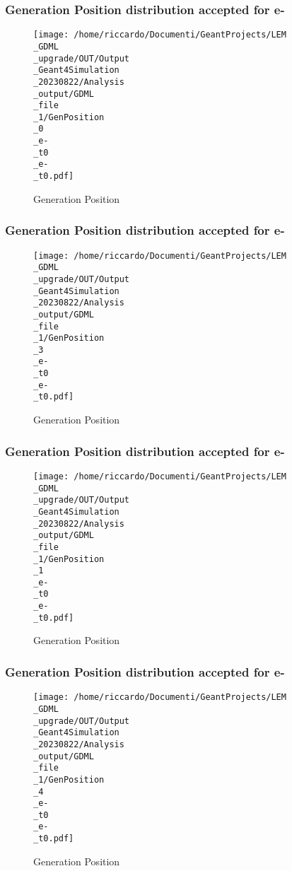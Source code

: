 \documentclass[8pt]{beamer}
\begin{document}
            \begin{frame}
                \frametitle{Generation Position distribution accepted for e-}
            
        \begin{figure}[h]
            \centering
            \texttt{[image: /home/riccardo/Documenti/GeantProjects/LEM\\\_GDML\\\_upgrade/OUT/Output\\\_Geant4Simulation\\\_20230822/Analysis\\\_output/GDML\\\_file\\\_1/GenPosition\\\_0\\\_e-\\\_t0\\\_e-\\\_t0.pdf]}
            \caption{Generation Position}
        \end{figure}
        
            \end{frame}
            
            \begin{frame}
                \frametitle{Generation Position distribution accepted for e-}
            
        \begin{figure}[h]
            \centering
            \texttt{[image: /home/riccardo/Documenti/GeantProjects/LEM\\\_GDML\\\_upgrade/OUT/Output\\\_Geant4Simulation\\\_20230822/Analysis\\\_output/GDML\\\_file\\\_1/GenPosition\\\_3\\\_e-\\\_t0\\\_e-\\\_t0.pdf]}
            \caption{Generation Position}
        \end{figure}
        
            \end{frame}
            
            \begin{frame}
                \frametitle{Generation Position distribution accepted for e-}
            
        \begin{figure}[h]
            \centering
            \texttt{[image: /home/riccardo/Documenti/GeantProjects/LEM\\\_GDML\\\_upgrade/OUT/Output\\\_Geant4Simulation\\\_20230822/Analysis\\\_output/GDML\\\_file\\\_1/GenPosition\\\_1\\\_e-\\\_t0\\\_e-\\\_t0.pdf]}
            \caption{Generation Position}
        \end{figure}
        
            \end{frame}
            
            \begin{frame}
                \frametitle{Generation Position distribution accepted for e-}
            
        \begin{figure}[h]
            \centering
            \texttt{[image: /home/riccardo/Documenti/GeantProjects/LEM\\\_GDML\\\_upgrade/OUT/Output\\\_Geant4Simulation\\\_20230822/Analysis\\\_output/GDML\\\_file\\\_1/GenPosition\\\_4\\\_e-\\\_t0\\\_e-\\\_t0.pdf]}
            \caption{Generation Position}
        \end{figure}
        
            \end{frame}
            
\end{document}
